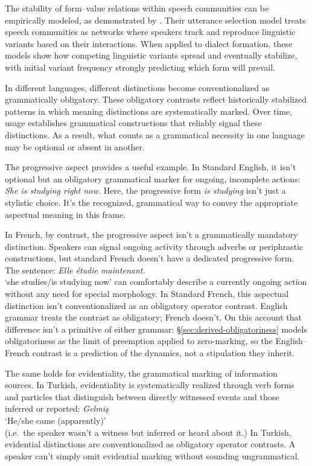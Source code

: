 \documentclass[12pt,letterpaper]{article}
\newcommand{\mention}[1]{\textit{#1}}
\newcommand{\olang}[1]{\textit{#1}}
\begin{document}
The stability of form--value relations within speech communities can be empirically modeled, as demonstrated by \textcite{blythe2009speech}. Their utterance selection model treats speech communities as networks where speakers track and reproduce linguistic variants based on their interactions. When applied to dialect formation, these models show how competing linguistic variants spread and eventually stabilize, with initial variant frequency strongly predicting which form will prevail.

\label{sec:community-values}%
In different languages, different distinctions become conventionalized as grammatically obligatory. These obligatory contrasts reflect historically stabilized patterns in which meaning distinctions are systematically marked. Over time, usage establishes grammatical constructions that reliably signal these distinctions. As a result, what counts as a grammatical necessity in one language may be optional or absent in another.

The progressive aspect provides a useful example. In Standard English, it isn't optional but an obligatory grammatical marker for ongoing, incomplete actions:
\ea
\mention{She is studying right now.}
\z
Here, the progressive form \mention{is studying} isn't just a stylistic choice. It's the recognized, grammatical way to convey the appropriate aspectual meaning in this frame.

In French, by contrast, the progressive aspect isn't a grammatically mandatory distinction. Speakers can signal ongoing activity through adverbs or periphrastic constructions, but standard French doesn't have a dedicated progressive form. The sentence:
\ea
\olang{Elle étudie maintenant.}\\
`she studies/is studying now'
\z
can comfortably describe a currently ongoing action without any need for special morphology. In Standard French, this aspectual distinction isn't conventionalized as an obligatory operator contrast. English grammar treats the contrast as obligatory; French doesn't. On this account that difference isn't a primitive of either grammar: \S\ref{sec:derived-obligatoriness} models obligatoriness as the limit of preemption applied to zero-marking, so the English--French contrast is a prediction of the dynamics, not a stipulation they inherit.

The same holds for evidentiality, the grammatical marking of information sources. In Turkish, evidentiality is systematically realized through verb forms and particles that distinguish between directly witnessed events and those inferred or reported:
\ea
\olang{Gelmiş}\\
`He/she came (apparently)' \\(i.e.\, the speaker wasn't a witness but inferred or heard about it.)
\z
In Turkish, evidential distinctions are conventionalized as obligatory operator contrasts. A speaker can't simply omit evidential marking without sounding ungrammatical.
\end{document}
